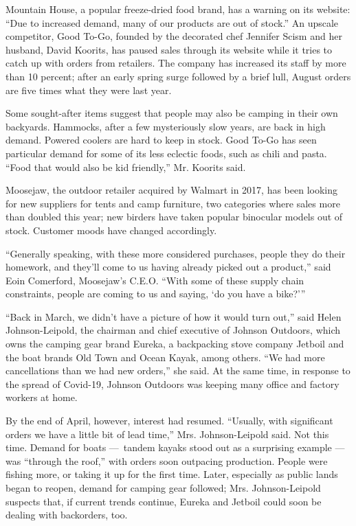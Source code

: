Mountain House, a popular freeze-dried food brand, has a warning on its
website: ``Due to increased demand, many of our products are out of
stock.'' An upscale competitor, Good To-Go, founded by the decorated
chef Jennifer Scism and her husband, David Koorits, has paused sales
through its website while it tries to catch up with orders from
retailers. The company has increased its staff by more than 10 percent;
after an early spring surge followed by a brief lull, August orders are
five times what they were last year.

Some sought-after items suggest that people may also be camping in their
own backyards. Hammocks, after a few mysteriously slow years, are back
in high demand. Powered coolers are hard to keep in stock. Good To-Go
has seen particular demand for some of its less eclectic foods, such as
chili and pasta. ``Food that would also be kid friendly,'' Mr. Koorits
said.

Moosejaw, the outdoor retailer acquired by Walmart in 2017, has been
looking for new suppliers for tents and camp furniture, two categories
where sales more than doubled this year; new birders have taken popular
binocular models out of stock. Customer moods have changed accordingly.

``Generally speaking, with these more considered purchases, people they
do their homework, and they'll come to us having already picked out a
product,'' said Eoin Comerford, Moosejaw's C.E.O. ``With some of these
supply chain constraints, people are coming to us and saying, `do you
have a bike?'''

``Back in March, we didn't have a picture of how it would turn out,''
said Helen Johnson-Leipold, the chairman and chief executive of Johnson
Outdoors, which owns the camping gear brand Eureka, a backpacking stove
company Jetboil and the boat brands Old Town and Ocean Kayak, among
others. ``We had more cancellations than we had new orders,'' she said.
At the same time, in response to the spread of Covid-19, Johnson
Outdoors was keeping many office and factory workers at home.

By the end of April, however, interest had resumed. ``Usually, with
significant orders we have a little bit of lead time,'' Mrs.
Johnson-Leipold said. Not this time. Demand for boats ---~tandem kayaks
stood out as a surprising example --- was ``through the roof,'' with
orders soon outpacing production. People were fishing more, or taking it
up for the first time. Later, especially as public lands began to
reopen, demand for camping gear followed; Mrs. Johnson-Leipold suspects
that, if current trends continue, Eureka and Jetboil could soon be
dealing with backorders, too.

